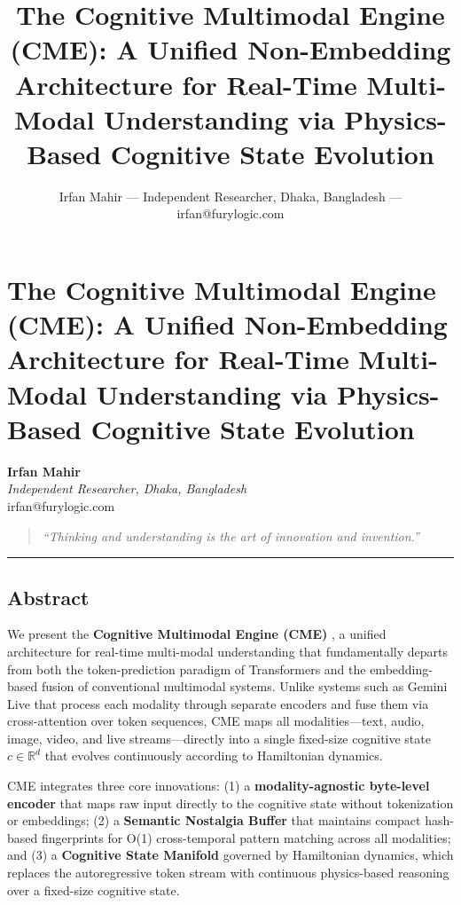 \documentclass[
  11pt,
  a4paper,
]{article}
\title{The Cognitive Multimodal Engine (CME): A Unified Non-Embedding
Architecture for Real-Time Multi-Modal Understanding via Physics-Based
Cognitive State Evolution}
\author{Irfan Mahir --- Independent Researcher, Dhaka, Bangladesh ---
irfan@furylogic.com}
\date{}
\begin{document}
\maketitle

{
\hypersetup{linkcolor=}
\setcounter{tocdepth}{3}
\tableofcontents
}
\section{The Cognitive Multimodal Engine (CME): A Unified Non-Embedding
Architecture for Real-Time Multi-Modal Understanding via Physics-Based
Cognitive State
Evolution}\label{the-cognitive-multimodal-engine-cme-a-unified-non-embedding-architecture-for-real-time-multi-modal-understanding-via-physics-based-cognitive-state-evolution}

\textbf{Irfan Mahir}\\
\emph{Independent Researcher, Dhaka, Bangladesh}\\
irfan@furylogic.com

\begin{quote}
\emph{``Thinking and understanding is the art of innovation and
invention.''}
\end{quote}

\begin{center}\rule{0.5\linewidth}{0.5pt}\end{center}

\subsection{Abstract}\label{abstract}

We present the \textbf{Cognitive Multimodal Engine (CME)} , a unified
architecture for real-time multi-modal understanding that fundamentally
departs from both the token-prediction paradigm of Transformers and the
embedding-based fusion of conventional multimodal systems. Unlike
systems such as Gemini Live that process each modality through separate
encoders and fuse them via cross-attention over token sequences, CME
maps all modalities---text, audio, image, video, and live
streams---directly into a single fixed-size cognitive state
\(c \in \mathbb{R}^{d}\) that evolves continuously according to
Hamiltonian dynamics.

CME integrates three core innovations: (1) a \textbf{modality-agnostic
byte-level encoder} that maps raw input directly to the cognitive state
without tokenization or embeddings; (2) a \textbf{Semantic Nostalgia
Buffer} that maintains compact hash-based fingerprints for O(1)
cross-temporal pattern matching across all modalities; and (3) a
\textbf{Cognitive State Manifold} governed by Hamiltonian dynamics,
which replaces the autoregressive token stream with continuous
physics-based reasoning over a fixed-size cognitive state.
\end{document}
